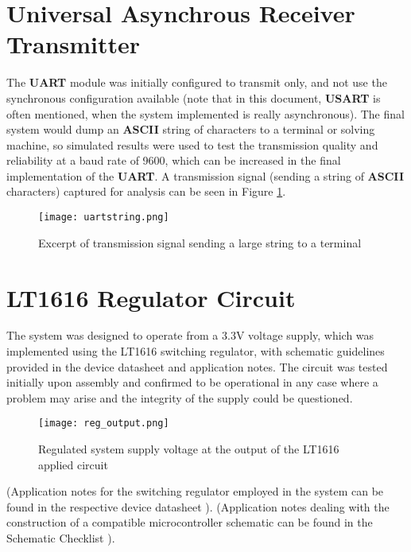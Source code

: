 \documentclass[11pt, a4paper, oneside]{Thesis} %
\begin{document}
\section{Universal Asynchrous Receiver Transmitter}
The \textbf{UART} module was initially configured to transmit only, and not use the synchronous configuration available (note that in this document, \textbf{USART} is often mentioned, when the system implemented is really asynchronous). The final system would dump an \textbf{ASCII} string of characters to a terminal or solving machine, so simulated results were used to test the transmission quality and reliability at a baud rate of 9600, which can be increased in the final implementation of the \textbf{UART}. A transmission signal (sending a string of \textbf{ASCII} characters) captured for analysis can be seen in Figure \ref{fig:uart_test}.

\begin{figure}[h]
  \begin{center}
    \texttt{[image: uartstring.png]}
  \end{center}
  \caption{Excerpt of transmission signal sending a large string to a terminal}
  \label{fig:uart_test}
\end{figure}

\section{LT1616 Regulator Circuit}
The system was designed to operate from a 3.3V voltage supply, which was implemented using the LT1616 switching regulator, with schematic guidelines provided in the device datasheet and application notes. The circuit was tested initially upon assembly and confirmed to be operational in any case where a problem may arise and the integrity of the supply could be questioned. 

\begin{figure}[h]
  \begin{center}
    \texttt{[image: reg\_output.png]}
  \end{center}
  \caption{Regulated system supply voltage at the output of the LT1616 applied circuit}
  \label{fig:reg_test}
\end{figure}
 
(Application notes for the switching regulator employed in the system can be found in the respective device datasheet \cite{lt1616}). (Application notes dealing with the construction of a compatible microcontroller schematic can be found in the Schematic Checklist \cite{uc3schematic}).
\end{document}
